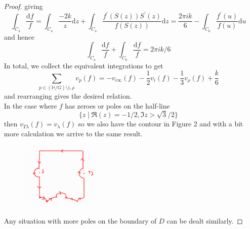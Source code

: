\documentclass[12pt]{article}
\theoremstyle{definition}
\begin{document}
\begin{proof}
giving
\[
    \int_{C_4}\frac{\mathrm{d}f }{f} = \int_{C_4}\frac{-2k }{z}\mathrm{d}z +\int_{C_4}\frac{f^{\prime} (S(z)) S^{\prime} (z)}{f(S(z))} \mathrm{d}z = \frac{2\pi i k}{6} - \int_{C_6}\frac{f^{\prime} (u) }{f(u)} \mathrm{d} u  
\]
and hence
\[
    \int_{C_4}\frac{\mathrm{d}f }{f}+\int_{C_6}\frac{\mathrm{d}f }{f} = 2\pi i k/6
\]
In total, we collect the equivalent integrations to get
\[
    \sum_{p\in (\mathbb{H}/G )\setminus {i,\rho } } v_p(f) = -v_{i\infty }(f)-\frac{1}{2}v_i(f)-\frac{1}{3}v_{\rho }(f) + \frac{k}{6} 
\]
and rearranging gives the desired relation.\\[6pt]
In the case where \(f\) has zeroes or poles on the half-line
\[
    \{ z \mid \Re(z)=-1/2, \Im z > \sqrt{3}/2  \} 
\]
then \(v_{T \lambda }(f) = v_\lambda (f)\) so we also have the contour in Figure 2
and with a bit more calculation we arrive to the same result.
\begin{figure}[H]
    \centering
    \includegraphics[width=0.35\textwidth]{Fig2.png}
    \caption{}
\end{figure}
Any situation with more poles on the boundary of \(D\) can be dealt similarly.  
\end{proof} 
\end{document}
